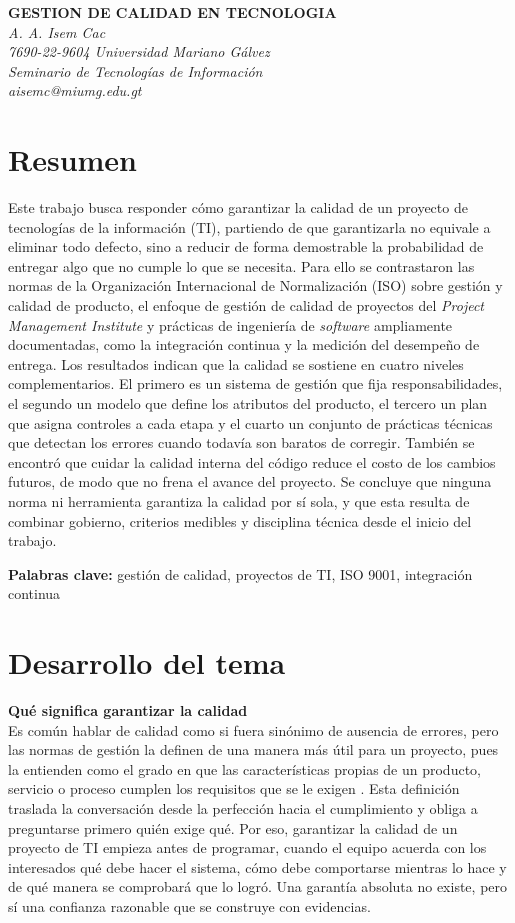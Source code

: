 \documentclass[12pt,letterpaper]{article}
\begin{document}
\begin{center}
\textbf{\uppercase{GESTION DE CALIDAD EN TECNOLOGIA}}\\
\textit{A. A. Isem Cac}\\
\textit{7690-22-9604 Universidad Mariano Gálvez}\\
\textit{Seminario de Tecnologías de Información}\\
\textit{aisemc@miumg.edu.gt}
\end{center}

\section*{Resumen}
Este trabajo busca responder cómo garantizar la calidad de un proyecto de tecnologías de la información (TI), partiendo de que garantizarla no equivale a eliminar todo defecto, sino a reducir de forma demostrable la probabilidad de entregar algo que no cumple lo que se necesita. Para ello se contrastaron las normas de la Organización Internacional de Normalización (ISO) sobre gestión y calidad de producto, el enfoque de gestión de calidad de proyectos del \textit{Project Management Institute} y prácticas de ingeniería de \textit{software} ampliamente documentadas, como la integración continua y la medición del desempeño de entrega. Los resultados indican que la calidad se sostiene en cuatro niveles complementarios. El primero es un sistema de gestión que fija responsabilidades, el segundo un modelo que define los atributos del producto, el tercero un plan que asigna controles a cada etapa y el cuarto un conjunto de prácticas técnicas que detectan los errores cuando todavía son baratos de corregir. También se encontró que cuidar la calidad interna del código reduce el costo de los cambios futuros, de modo que no frena el avance del proyecto. Se concluye que ninguna norma ni herramienta garantiza la calidad por sí sola, y que esta resulta de combinar gobierno, criterios medibles y disciplina técnica desde el inicio del trabajo.

\noindent\textbf{Palabras clave: }gestión de calidad, proyectos de TI, ISO 9001, integración continua

\section*{Desarrollo del tema}

\textbf{Qué significa garantizar la calidad}\\
Es común hablar de calidad como si fuera sinónimo de ausencia de errores, pero las normas de gestión la definen de una manera más útil para un proyecto, pues la entienden como el grado en que las características propias de un producto, servicio o proceso cumplen los requisitos que se le exigen \parencite{iso_9001_2026}. Esta definición traslada la conversación desde la perfección hacia el cumplimiento y obliga a preguntarse primero quién exige qué. Por eso, garantizar la calidad de un proyecto de TI empieza antes de programar, cuando el equipo acuerda con los interesados qué debe hacer el sistema, cómo debe comportarse mientras lo hace y de qué manera se comprobará que lo logró. Una garantía absoluta no existe, pero sí una confianza razonable que se construye con evidencias.
\end{document}
